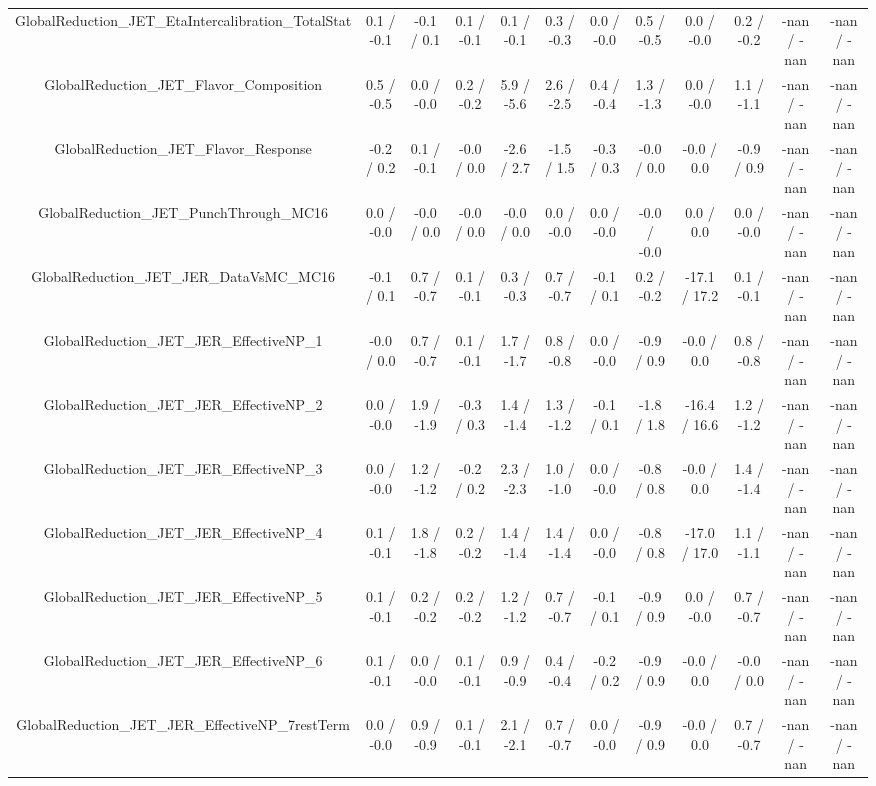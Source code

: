 \begin{table}[htbp]
\begin{center}
\begin{tabular}{|c|c|c|c|c|c|c|c|c|c|c|c|}
  GlobalReduction_JET_EtaIntercalibration_TotalStat & 0.1 / -0.1 & -0.1 / 0.1 & 0.1 / -0.1 & 0.1 / -0.1 & 0.3 / -0.3 & 0.0 / -0.0 & 0.5 / -0.5 & 0.0 / -0.0 & 0.2 / -0.2 & -nan / -nan & -nan / -nan \\ 
  GlobalReduction_JET_Flavor_Composition & 0.5 / -0.5 & 0.0 / -0.0 & 0.2 / -0.2 & 5.9 / -5.6 & 2.6 / -2.5 & 0.4 / -0.4 & 1.3 / -1.3 & 0.0 / -0.0 & 1.1 / -1.1 & -nan / -nan & -nan / -nan \\ 
  GlobalReduction_JET_Flavor_Response & -0.2 / 0.2 & 0.1 / -0.1 & -0.0 / 0.0 & -2.6 / 2.7 & -1.5 / 1.5 & -0.3 / 0.3 & -0.0 / 0.0 & -0.0 / 0.0 & -0.9 / 0.9 & -nan / -nan & -nan / -nan \\ 
  GlobalReduction_JET_PunchThrough_MC16 & 0.0 / -0.0 & -0.0 / 0.0 & -0.0 / 0.0 & -0.0 / 0.0 & 0.0 / -0.0 & 0.0 / -0.0 & -0.0 / -0.0 & 0.0 / 0.0 & 0.0 / -0.0 & -nan / -nan & -nan / -nan \\ 
  GlobalReduction_JET_JER_DataVsMC_MC16 & -0.1 / 0.1 & 0.7 / -0.7 & 0.1 / -0.1 & 0.3 / -0.3 & 0.7 / -0.7 & -0.1 / 0.1 & 0.2 / -0.2 & -17.1 / 17.2 & 0.1 / -0.1 & -nan / -nan & -nan / -nan \\ 
  GlobalReduction_JET_JER_EffectiveNP_1 & -0.0 / 0.0 & 0.7 / -0.7 & 0.1 / -0.1 & 1.7 / -1.7 & 0.8 / -0.8 & 0.0 / -0.0 & -0.9 / 0.9 & -0.0 / 0.0 & 0.8 / -0.8 & -nan / -nan & -nan / -nan \\ 
  GlobalReduction_JET_JER_EffectiveNP_2 & 0.0 / -0.0 & 1.9 / -1.9 & -0.3 / 0.3 & 1.4 / -1.4 & 1.3 / -1.2 & -0.1 / 0.1 & -1.8 / 1.8 & -16.4 / 16.6 & 1.2 / -1.2 & -nan / -nan & -nan / -nan \\ 
  GlobalReduction_JET_JER_EffectiveNP_3 & 0.0 / -0.0 & 1.2 / -1.2 & -0.2 / 0.2 & 2.3 / -2.3 & 1.0 / -1.0 & 0.0 / -0.0 & -0.8 / 0.8 & -0.0 / 0.0 & 1.4 / -1.4 & -nan / -nan & -nan / -nan \\ 
  GlobalReduction_JET_JER_EffectiveNP_4 & 0.1 / -0.1 & 1.8 / -1.8 & 0.2 / -0.2 & 1.4 / -1.4 & 1.4 / -1.4 & 0.0 / -0.0 & -0.8 / 0.8 & -17.0 / 17.0 & 1.1 / -1.1 & -nan / -nan & -nan / -nan \\ 
  GlobalReduction_JET_JER_EffectiveNP_5 & 0.1 / -0.1 & 0.2 / -0.2 & 0.2 / -0.2 & 1.2 / -1.2 & 0.7 / -0.7 & -0.1 / 0.1 & -0.9 / 0.9 & 0.0 / -0.0 & 0.7 / -0.7 & -nan / -nan & -nan / -nan \\ 
  GlobalReduction_JET_JER_EffectiveNP_6 & 0.1 / -0.1 & 0.0 / -0.0 & 0.1 / -0.1 & 0.9 / -0.9 & 0.4 / -0.4 & -0.2 / 0.2 & -0.9 / 0.9 & -0.0 / 0.0 & -0.0 / 0.0 & -nan / -nan & -nan / -nan \\ 
  GlobalReduction_JET_JER_EffectiveNP_7restTerm & 0.0 / -0.0 & 0.9 / -0.9 & 0.1 / -0.1 & 2.1 / -2.1 & 0.7 / -0.7 & 0.0 / -0.0 & -0.9 / 0.9 & -0.0 / 0.0 & 0.7 / -0.7 & -nan / -nan & -nan / -nan \\ 

\end{tabular}
\end{center}
\end{table}
